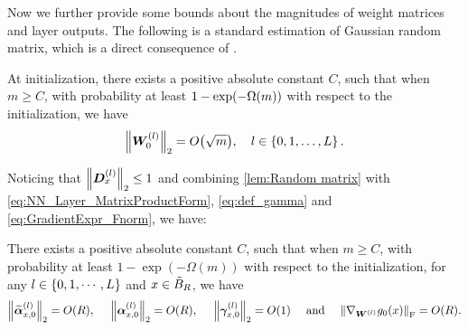 Now we further provide some bounds about the magnitudes of weight matrices and layer outputs.
The following is a standard estimation of Gaussian random matrix, which is a direct consequence of \citet[Corollary 5.35]{vershynin2010_IntroductionNonasymptotic}.
\begin{lemma}
  \label{lem:Random matrix}At initialization, there exists a positive absolute constant $C$, 
  such that when $m\geq C$, with probability at least $1-\exp\xkm{-\Omega(m)}$ with respect to the initialization,
  we have
  \begin{align*}
    \norm{\bm{W}^{(l)}_0}_2 = O\xkm{\sqrt{m}},\quad l\in \dk{0,1,\dots,L}.
  \end{align*}
\end{lemma}


Noticing that $\norm{\bm{D}^{(l)}_{x}}_2 \leq 1$ and combining \cref{lem:Random matrix} with \cref{eq:NN_Layer_MatrixProductForm}, \cref{eq:def_gamma} and \cref{eq:GradientExpr_Fnorm}, we have:

\begin{lemma}
  \label{lem:Init_WeightsProductBound}There exists a positive absolute constant $C$, 
  such that when $m\geq C$, with probability at least $1-\exp(-\Omega(m))$ with respect to the initialization, for any
  $l\in\left\{0,1,\cdots,L\right\}$ and $x \in \tilde{B}_R$, we have
  \begin{align*}
    \begin{gathered}
      \norm{\widetilde{\bm{\alpha}}_{x,0}^{(l)}}_2 = O(R),\quad~\norm{{\bm{\alpha}}_{x,0}^{(l)}}_2 = O(R),\quad~\norm{\bm{\gamma}^{(l)}_{x,0}}_2=O(1)
      \quad~\text{and}\quad~
      \norm{\nabla_{\bm{W}^{(l)}} g_0(x) }_{\mathrm{F}} = O(R).
    \end{gathered}
  \end{align*}
\end{lemma}

